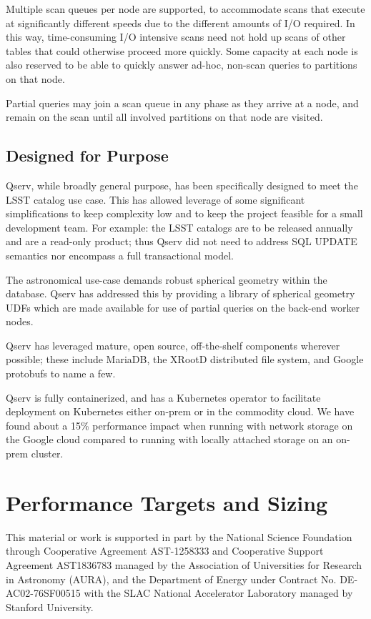 \documentclass[11pt,twoside]{article}
\begin{document}
Multiple scan queues per node are supported, to accommodate scans that execute at significantly different
speeds due to the different amounts of I/O required.  In this way, time-consuming I/O intensive scans need not
hold up scans of other tables that could otherwise proceed more quickly.  Some capacity at each node is also
reserved to be able to quickly answer ad-hoc, non-scan queries to partitions on that node.

Partial queries may join a scan queue in any phase as they arrive at a node, and remain on the scan until all
involved partitions on that node are visited.

\subsection{Designed for Purpose}

Qserv, while broadly general purpose, has been specifically designed to meet the LSST catalog use case.  This
has allowed leverage of some significant simplifications to keep complexity low and to keep the project
feasible for a small development team.  For example: the LSST catalogs are to be released annually and are a
read-only product; thus Qserv did not need to address SQL UPDATE semantics nor encompass a full transactional
model.

The astronomical use-case demands robust spherical geometry within the database.  Qserv has addressed
this by providing a library of spherical geometry UDFs which are made available for use of partial queries on
the back-end worker nodes.

Qserv has leveraged mature, open source, off-the-shelf components wherever possible; these include MariaDB,
the XRootD distributed file system, and Google protobufs to name a few.

Qserv is fully containerized, and has a Kubernetes operator to facilitate deployment on Kubernetes either
on-prem or in the commodity cloud.  We have found about a 15\% performance impact when running with network
storage on the Google cloud compared to running with locally attached storage on an on-prem cluster.

\section{Performance Targets and Sizing}

\acknowledgements This material or work is supported in part by the National Science Foundation through
Cooperative Agreement AST-1258333 and Cooperative Support Agreement AST1836783 managed by the Association of
Universities for Research in Astronomy (AURA), and the Department of Energy under Contract No.
DE-AC02-76SF00515 with the SLAC National Accelerator Laboratory managed by Stanford University.


\end{document}
